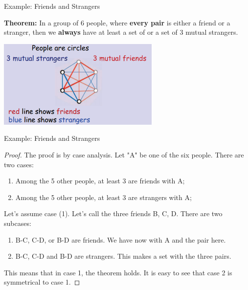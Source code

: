 \begin{frame}{Example: Friends and Strangers}

  {\bf Theorem:} In a group of 6 people, where {\bf every pair} is either a friend or a stranger, then we {\bf always} have at least a set of  or a set of \alert{3 mutual strangers}.

  \begin{center}
    \includegraphics[width=0.6\textwidth]{../img/friends_and_strangers}
  \end{center}
\end{frame}

\begin{frame}{Example: Friends and Strangers}
  \begin{proof}
    The proof is by case analysis. Let "A" be one of the six people. There are two cases:
    \begin{enumerate}
      \item Among the 5 other people, at least 3 are friends with A;
      \item Among the 5 other people, at least 3 are strangers with A;
    \end{enumerate}\medskip

    Let's assume case (1). Let's call the three friends B, C, D. There are two subcases:
    \begin{enumerate}[A]
      \item B-C, C-D, or B-D are friends. We have now  with A and the pair here.
      \item B-C, C-D and B-D are strangers. This makes a  set with the three pairs.
    \end{enumerate}\medskip

    This means that in case 1, the theorem holds. It is easy to see that case 2 is symmetrical to case 1.
  \end{proof}
\end{frame}



